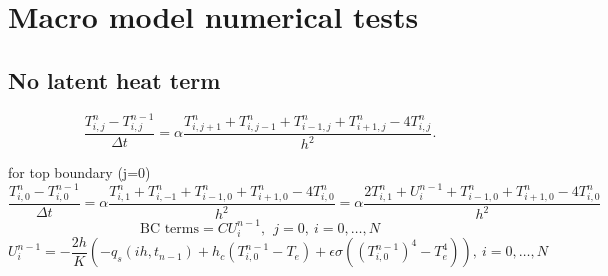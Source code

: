 \documentclass[a4paper,12pt]{article}
\newcommand{\V}[1]{\boldsymbol{#1}}
\newcommand{\grad}[1]{\nabla_{#1}}
\begin{document}


\section{Macro model numerical tests}

\subsection{No latent heat term}

\begin{equation}
\frac{T_{i,j}^n - T_{i,j}^{n-1}}{\Delta t} = \alpha \frac{T_{i,j+1}^n + T_{i,j-1}^n + T_{i-1,j}^n + T_{i+1,j}^n - 4 T_{i,j}^n }{h^2}.
\end{equation}


for top boundary (j=0)
\begin{equation}
\frac{T_{i,0}^n - T_{i,0}^{n-1}}{\Delta t} = \alpha \frac{T_{i,1}^n + T_{i,-1}^n + T_{i-1,0}^n + T_{i+1,0}^n - 4 T_{i,0}^n }{h^2} =\alpha \frac{2T_{i,1}^n + U_i^{n-1}+ T_{i-1,0}^n + T_{i+1,0}^n - 4 T_{i,0}^n }{h^2} 
\end{equation}
\begin{equation}
 \text{BC terms}=CU_i^{n-1},\ \  j=0,  \ i = 0 , \dots , N
\end{equation}
\begin{equation}
U_i^{n-1}=-\frac{2h}{K}\left(-q_s (ih, t_{n-1}) + h_c (T^{n-1}_{i,0} - T_e) + \epsilon \sigma ( (T^{n-1}_{i,0})^4 - T_e^4)\right), \ i = 0 , \dots , N
\end{equation}
\end{document}
